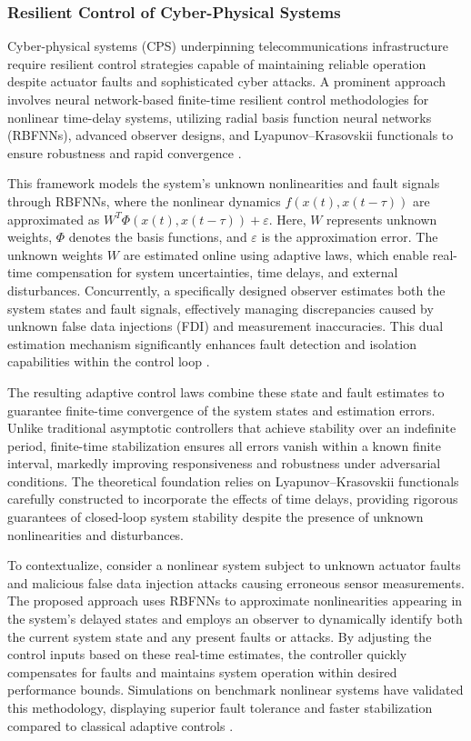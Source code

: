 \documentclass[sigconf]{acmart}
\begin{document}
\subsubsection{Resilient Control of Cyber-Physical Systems}

Cyber-physical systems (CPS) underpinning telecommunications infrastructure require resilient control strategies capable of maintaining reliable operation despite actuator faults and sophisticated cyber attacks. A prominent approach involves neural network-based finite-time resilient control methodologies for nonlinear time-delay systems, utilizing radial basis function neural networks (RBFNNs), advanced observer designs, and Lyapunov--Krasovskii functionals to ensure robustness and rapid convergence \cite{ref46}.

This framework models the system’s unknown nonlinearities and fault signals through RBFNNs, where the nonlinear dynamics \( f(x(t), x(t-\tau)) \) are approximated as \( W^{T} \Phi(x(t), x(t-\tau)) + \varepsilon \). Here, \( W \) represents unknown weights, \( \Phi \) denotes the basis functions, and \( \varepsilon \) is the approximation error. The unknown weights \( W \) are estimated online using adaptive laws, which enable real-time compensation for system uncertainties, time delays, and external disturbances. Concurrently, a specifically designed observer estimates both the system states and fault signals, effectively managing discrepancies caused by unknown false data injections (FDI) and measurement inaccuracies. This dual estimation mechanism significantly enhances fault detection and isolation capabilities within the control loop \cite{ref46}.

The resulting adaptive control laws combine these state and fault estimates to guarantee finite-time convergence of the system states and estimation errors. Unlike traditional asymptotic controllers that achieve stability over an indefinite period, finite-time stabilization ensures all errors vanish within a known finite interval, markedly improving responsiveness and robustness under adversarial conditions. The theoretical foundation relies on Lyapunov--Krasovskii functionals carefully constructed to incorporate the effects of time delays, providing rigorous guarantees of closed-loop system stability despite the presence of unknown nonlinearities and disturbances.

To contextualize, consider a nonlinear system subject to unknown actuator faults and malicious false data injection attacks causing erroneous sensor measurements. The proposed approach uses RBFNNs to approximate nonlinearities appearing in the system's delayed states and employs an observer to dynamically identify both the current system state and any present faults or attacks. By adjusting the control inputs based on these real-time estimates, the controller quickly compensates for faults and maintains system operation within desired performance bounds. Simulations on benchmark nonlinear systems have validated this methodology, displaying superior fault tolerance and faster stabilization compared to classical adaptive controls \cite{ref46}.
\end{document}
